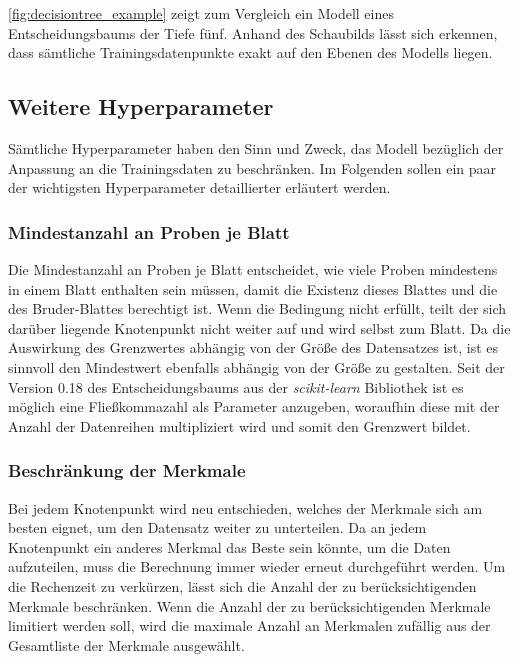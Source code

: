 \documentclass[12pt, a4paper]{article}
\begin{document}
\autoref{fig:decisiontree_example} zeigt zum Vergleich ein Modell eines Entscheidungsbaums der Tiefe fünf. Anhand des Schaubilds lässt sich erkennen, dass sämtliche Trainingsdatenpunkte exakt auf den Ebenen des Modells liegen. 

\subsection{Weitere Hyperparameter}

Sämtliche Hyperparameter haben den Sinn und Zweck, das Modell bezüglich der Anpassung an die Trainingsdaten zu beschränken. Im Folgenden sollen ein paar der wichtigsten Hyperparameter detaillierter erläutert werden.

\subsubsection{Mindestanzahl an Proben je Blatt} 

Die Mindestanzahl an Proben je Blatt entscheidet, wie viele Proben mindestens in einem Blatt enthalten sein müssen, damit die Existenz dieses Blattes und die des Bruder-Blattes berechtigt ist. Wenn die Bedingung nicht erfüllt, teilt der sich darüber liegende Knotenpunkt nicht weiter auf und wird selbst zum Blatt. Da die Auswirkung des Grenzwertes abhängig von der Größe des Datensatzes ist, ist es sinnvoll den Mindestwert ebenfalls abhängig von der Größe zu gestalten. Seit der Version 0.18 des Entscheidungsbaums aus der \textit{scikit-learn} Bibliothek ist es möglich eine Fließkommazahl als Parameter anzugeben, woraufhin diese mit der Anzahl der Datenreihen multipliziert wird und somit den Grenzwert bildet.

\subsubsection{Beschränkung der Merkmale}

Bei jedem Knotenpunkt wird neu entschieden, welches der Merkmale sich am besten eignet, um den Datensatz weiter zu unterteilen. Da an jedem Knotenpunkt ein anderes Merkmal das Beste sein könnte, um die Daten aufzuteilen, muss die Berechnung immer wieder erneut durchgeführt werden. Um die Rechenzeit zu verkürzen, lässt sich die Anzahl der zu berücksichtigenden Merkmale beschränken. Wenn die Anzahl der zu berücksichtigenden Merkmale limitiert werden soll, wird die maximale Anzahl an Merkmalen zufällig aus der Gesamtliste der Merkmale ausgewählt. 
\end{document}

